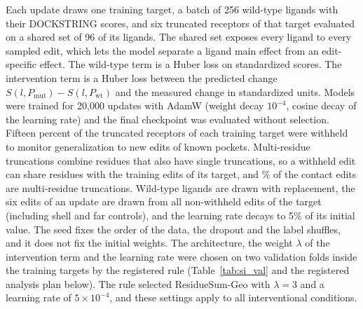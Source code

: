 Each update draws one training target, a batch of 256 wild-type ligands with their DOCKSTRING scores, and six truncated receptors of that target evaluated on a shared set of 96 of its ligands. The shared set exposes every ligand to every sampled edit, which lets the model separate a ligand main effect from an edit-specific effect. The wild-type term is a Huber loss on standardized scores. The intervention term is a Huber loss between the predicted change $S(l,P_\mathrm{mut}) - S(l,P_\mathrm{wt})$ and the measured change in standardized units. Models were trained for 20,000 updates with AdamW (weight decay $10^{-4}$, cosine decay of the learning rate) and the final checkpoint was evaluated without selection. Fifteen percent of the truncated receptors of each training target were withheld to monitor generalization to new edits of known pockets. Multi-residue truncations combine residues that also have single truncations, so a withheld edit can share residues with the training edits of its target, and \shareMultiTrain{}\% of the contact edits are multi-residue truncations. Wild-type ligands are drawn with replacement, the six edits of an update are drawn from all non-withheld edits of the target (including shell and far controls), and the learning rate decays to 5\% of its initial value. The seed fixes the order of the data, the dropout and the label shuffles, and it does not fix the initial weights. The architecture, the weight $\lambda$ of the intervention term and the learning rate were chosen on two validation folds inside the training targets by the registered rule (Table~\ref{tab:si_val} and the registered analysis plan below). The rule selected ResidueSum-Geo with $\lambda = 3$ and a learning rate of $5\times10^{-4}$, and these settings apply to all interventional conditions.

